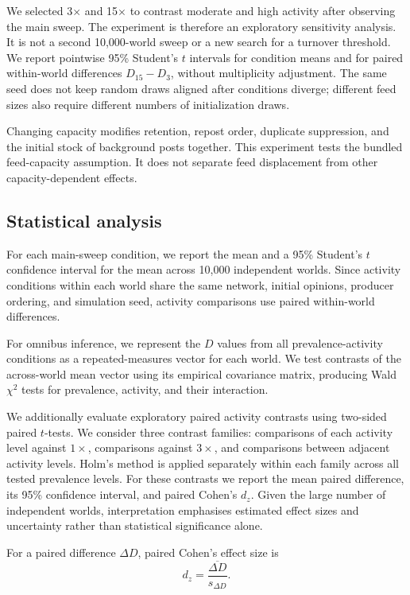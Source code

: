 \documentclass[runningheads]{llncs}
\begin{document}
We selected 3\(\times\) and 15\(\times\) to contrast moderate and high activity after observing the main sweep. The experiment is therefore an exploratory sensitivity analysis. It is not a second 10,000-world sweep or a new search for a turnover threshold. We report pointwise 95\% Student's \(t\) intervals for condition means and for paired within-world differences \(D_{15}-D_3\), without multiplicity adjustment. The same seed does not keep random draws aligned after conditions diverge; different feed sizes also require different numbers of initialization draws.

Changing capacity modifies retention, repost order, duplicate suppression, and the initial stock of background posts together. This experiment tests the bundled feed-capacity assumption. It does not separate feed displacement from other capacity-dependent effects.

\subsection{Statistical analysis}

For each main-sweep condition, we report the mean and a 95\% Student's \(t\) confidence interval for the mean across 10,000 independent worlds. Since activity conditions within each world share the same network, initial opinions, producer ordering, and simulation seed, activity comparisons use paired within-world differences.

For omnibus inference, we represent the \(D\) values from all prevalence-activity conditions as a repeated-measures vector for each world. We test contrasts of the across-world mean vector using its empirical covariance matrix, producing Wald \(\chi^2\) tests for prevalence, activity, and their interaction.

We additionally evaluate exploratory paired activity contrasts using two-sided paired \(t\)-tests. We consider three contrast families: comparisons of each activity level against \(1\times\), comparisons against \(3\times\), and comparisons between adjacent activity levels. Holm's method is applied separately within each family across all tested prevalence levels. For these contrasts we report the mean paired difference, its 95\% confidence interval, and paired Cohen's \(d_z\). Given the large number of independent worlds, interpretation emphasises estimated effect sizes and uncertainty rather than statistical significance alone.

For a paired difference \(\Delta D\), paired Cohen's effect size is
\[
d_z=\frac{\overline{\Delta D}}{s_{\Delta D}}.
\]
\end{document}
